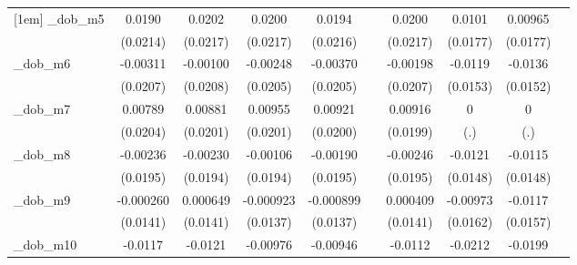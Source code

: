 \begin{table}[htbp]
\begin{tabular}{l*{9}{c}}
[1em]
\_dob\_m5     &      0.0190         &      0.0202         &      0.0200         &      0.0194         &                     &      0.0200         &      0.0101         &     0.00965         &                     \\
            &    (0.0214)         &    (0.0217)         &    (0.0217)         &    (0.0216)         &                     &    (0.0217)         &    (0.0177)         &    (0.0177)         &                     \\
[1em]
\_dob\_m6     &    -0.00311         &    -0.00100         &    -0.00248         &    -0.00370         &                     &    -0.00198         &     -0.0119         &     -0.0136         &                     \\
            &    (0.0207)         &    (0.0208)         &    (0.0205)         &    (0.0205)         &                     &    (0.0207)         &    (0.0153)         &    (0.0152)         &                     \\
[1em]
\_dob\_m7     &     0.00789         &     0.00881         &     0.00955         &     0.00921         &                     &     0.00916         &           0         &           0         &                     \\
            &    (0.0204)         &    (0.0201)         &    (0.0201)         &    (0.0200)         &                     &    (0.0199)         &         (.)         &         (.)         &                     \\
[1em]
\_dob\_m8     &    -0.00236         &    -0.00230         &    -0.00106         &    -0.00190         &                     &    -0.00246         &     -0.0121         &     -0.0115         &                     \\
            &    (0.0195)         &    (0.0194)         &    (0.0194)         &    (0.0195)         &                     &    (0.0195)         &    (0.0148)         &    (0.0148)         &                     \\
[1em]
\_dob\_m9     &   -0.000260         &    0.000649         &   -0.000923         &   -0.000899         &                     &    0.000409         &    -0.00973         &     -0.0117         &                     \\
            &    (0.0141)         &    (0.0141)         &    (0.0137)         &    (0.0137)         &                     &    (0.0141)         &    (0.0162)         &    (0.0157)         &                     \\
[1em]
\_dob\_m10    &     -0.0117         &     -0.0121         &    -0.00976         &    -0.00946         &                     &     -0.0112         &     -0.0212         &     -0.0199         &                     \\

\end{tabular}
\end{table}
